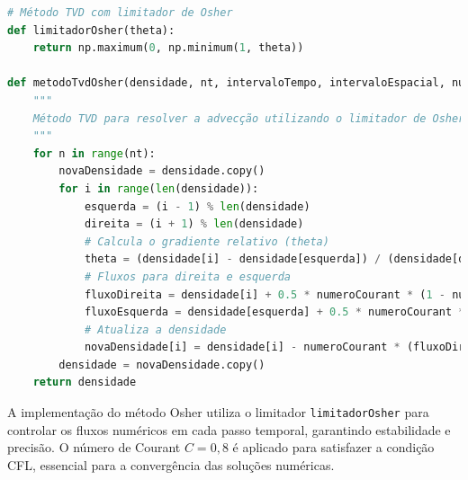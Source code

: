\begin{lstlisting}[language=Python, caption={Código para resolver a advecção usando o método Osher}, label={lst:codigo_osher}]
# Método TVD com limitador de Osher
def limitadorOsher(theta):
    return np.maximum(0, np.minimum(1, theta))

def metodoTvdOsher(densidade, nt, intervaloTempo, intervaloEspacial, numeroCourant):
    """
    Método TVD para resolver a advecção utilizando o limitador de Osher.
    """
    for n in range(nt):
        novaDensidade = densidade.copy()
        for i in range(len(densidade)):
            esquerda = (i - 1) % len(densidade)
            direita = (i + 1) % len(densidade)
            # Calcula o gradiente relativo (theta)
            theta = (densidade[i] - densidade[esquerda]) / (densidade[direita] - densidade[i] + 1e-6)
            # Fluxos para direita e esquerda
            fluxoDireita = densidade[i] + 0.5 * numeroCourant * (1 - numeroCourant) * limitadorOsher(theta) * (densidade[direita] - densidade[i])
            fluxoEsquerda = densidade[esquerda] + 0.5 * numeroCourant * (1 - numeroCourant) * limitadorOsher(theta) * (densidade[i] - densidade[esquerda])
            # Atualiza a densidade
            novaDensidade[i] = densidade[i] - numeroCourant * (fluxoDireita - fluxoEsquerda)
        densidade = novaDensidade.copy()
    return densidade
\end{lstlisting}


A implementação do método Osher utiliza o limitador \texttt{limitadorOsher} para controlar os fluxos numéricos em cada passo temporal, garantindo estabilidade e precisão. O número de Courant \(C = 0,8\) é aplicado para satisfazer a condição CFL, essencial para a convergência das soluções numéricas.
